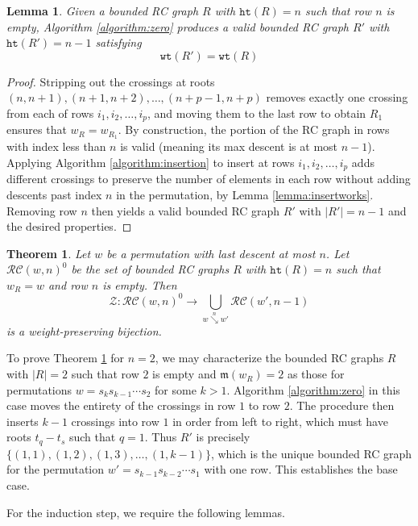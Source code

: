 \documentclass{amsart}
\newtheorem{lemma}{Lemma}[subsection]
\newtheorem{theorem}{Theorem}[section]
\theoremstyle{definition}
\theoremstyle{remark}
\numberwithin{equation}{subsection}
\newcommand{\downvar}[1]{\stackrel{#1}{\searrow}}
\newcommand{\wof}[1]{w_{#1}}
\newcommand{\wtt}{\mathtt{wt}}
\newcommand{\zeromap}{\mathcal{Z}}
\newcommand{\hr}{\mathtt{ht}}
\newcommand{\maxd}{\mathfrak{m}}
\begin{document}
\begin{lemma}
Given a bounded RC graph $R$ with $\hr(R)=n$ such that row $n$ is empty, Algorithm \ref{algorithm:zero} produces a valid bounded RC graph $R'$ with $\hr(R')=n-1$ satisfying
$$\wtt(R') = \wtt(R)$$
\end{lemma}
\begin{proof}
	Stripping out the crossings at roots $(n, n+1), (n+1, n+2), \ldots, (n + p - 1, n + p)$ removes exactly one crossing from each of rows $i_1, i_2, \ldots, i_p$, and moving them to the last row to obtain $R_1$ ensures that $\wof{R}=\wof{R_1}$. By construction, the portion of the RC graph in rows with index less than $n$ is valid (meaning its max descent is at most $n-1$). Applying Algorithm \ref{algorithm:insertion} to insert at rows $i_1, i_2, \ldots, i_p$ adds different crossings to preserve the number of elements in each row without adding descents past index $n$ in the permutation, by Lemma \ref{lemma:insertworks}. Removing row $n$ then yields a valid bounded RC graph $R'$ with $|R'|=n-1$ and the desired properties. 
\end{proof}



\begin{theorem} \label{theorem:zero_bijection}
Let $w$ be a permutation with last descent at most $n$. Let $\mathcal{RC}(w,n)^0$ be the set of bounded RC graphs $R$ with $\hr(R)=n$ such that $\wof{R}=w$ and row $n$ is empty. Then
$$\zeromap:\mathcal{RC}(w, n)^{0}\to \bigcup_{w\downvar{n} w'}\mathcal{RC}(w', n-1)$$
is a weight-preserving bijection.
\end{theorem}

To prove Theorem \ref{theorem:zero_bijection} for $n=2$, we may characterize the bounded RC graphs $R$ with $|R|=2$ such that row $2$ is empty and $\maxd(\wof{R})=2$ as those for permutations $w=s_k s_{k-1}\cdots s_2$ for some $k>1$. Algorithm \ref{algorithm:zero} in this case moves the entirety of the crossings in row $1$ to row $2$. The procedure then inserts $k-1$ crossings into row $1$ in order from left to right, which must have roots $t_q - t_s$ such that $q=1$. Thus $R'$ is precisely $\{(1,1), (1,2), (1,3), \ldots, (1, k-1)\}$, which is the unique bounded RC graph for the permutation $w' = s_{k-1} s_{k-2}\cdots s_1$ with one row. This establishes the base case.

For the induction step, we require the following lemmas.
\end{document}
